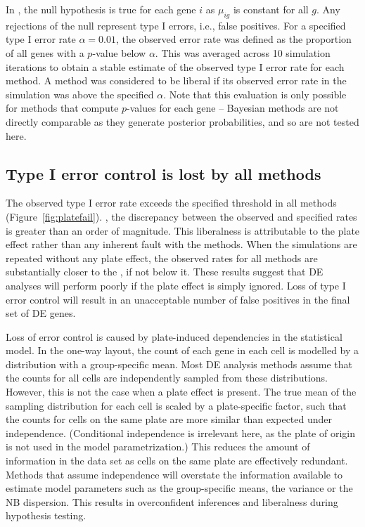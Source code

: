 \documentclass[oupdraft]{bio}
\begin{document}
In , the null hypothesis is true for each gene $i$ as $\mu_{ig}$ is constant for all $g$.
Any rejections of the null represent type I errors, i.e., false positives.
For a specified type I error rate $\alpha = 0.01$, the observed error rate was defined as the proportion of all genes with a $p$-value below $\alpha$.
This was averaged across 10 simulation iterations to obtain a stable estimate of the observed type I error rate for each method. 
A method was considered to be liberal if its observed error rate in the simulation was above the specified $\alpha$.
Note that this evaluation is only possible for methods that compute $p$-values for each gene -- 
    Bayesian methods \citep{kharchenko2014bayesian} are not directly comparable as they generate posterior probabilities, and so are not tested here.


\subsection{Type I error control is lost by all methods}
The observed type I error rate exceeds the specified threshold in all methods (Figure~\ref{fig:platefail}).
, the discrepancy between the observed and specified rates is greater than an order of magnitude.
This liberalness is attributable to the plate effect rather than any inherent fault with the methods.
When the simulations are repeated without any plate effect, the observed rates for all methods are substantially closer to the , if not below it.
These results suggest that DE analyses will perform poorly if the plate effect is simply ignored.
Loss of type I error control will result in an unacceptable number of false positives in the final set of DE genes.

Loss of error control is caused by plate-induced dependencies in the statistical model.
In the one-way layout, the count of each gene in each cell is modelled by a distribution with a group-specific mean.
Most DE analysis methods assume that the counts for all cells are independently sampled from these distributions.
However, this is not the case when a plate effect is present.
The true mean of the sampling distribution for each cell is scaled by a plate-specific factor, 
    such that the counts for cells on the same plate are more similar than expected under independence.
(Conditional independence is irrelevant here, as the plate of origin is not used in the model parametrization.)
This reduces the amount of information in the data set as cells on the same plate are effectively redundant.
Methods that assume independence will overstate the information available to estimate model parameters such as the group-specific means, the variance or the NB dispersion.
This results in overconfident inferences and liberalness during hypothesis testing.
\end{document}
